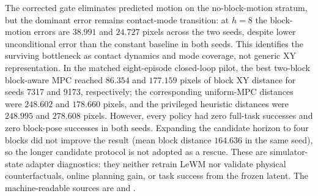 \documentclass{article}
\begin{document}
\begin{table}[H]
\centering
\scriptsize
\setlength{\tabcolsep}{5pt}
\caption{Repaired contact-aware physical-adapter diagnostic on 48 held-out
cases for each independent seed. Entries are mean block-XY errors in pixels;
episode-bootstrap 95\% CIs are available in the machine-readable artifacts.
Contact is defined by block-pose change, not the environment's aggregate
collision counter. The no-block-motion stratum is closed, while contact-mode
transitions remain the dominant error source.}
\label{tab:supp-contact-gated-closure}
\end{table}

The corrected gate eliminates predicted motion on the no-block-motion
stratum, but the dominant error remains contact-mode transition: at $h=8$ the
block-motion errors are $38.991$ and $24.727$ pixels across the two seeds,
despite lower unconditional error than the constant baseline in both seeds.
This identifies the surviving bottleneck as contact dynamics and mode
coverage, not generic XY representation. In the matched eight-episode
closed-loop pilot, the best two-block block-aware MPC reached $86.354$ and
$177.159$ pixels of block XY distance for seeds 7317 and 9173, respectively;
the corresponding uniform-MPC distances were $248.602$ and $178.660$ pixels,
and the privileged heuristic distances were $248.995$ and $278.608$ pixels.
However, every policy had zero full-task successes and zero block-pose
successes in both seeds. Expanding the candidate horizon to four blocks did
not improve the result (mean block distance $164.636$ in the same seed), so
the longer candidate protocol is not adopted as a rescue. These are
simulator-state adapter diagnostics: they neither retrain LeWM nor validate
physical counterfactuals, online planning gain, or task success from the
frozen latent. The machine-readable sources are
and
.
\end{document}
